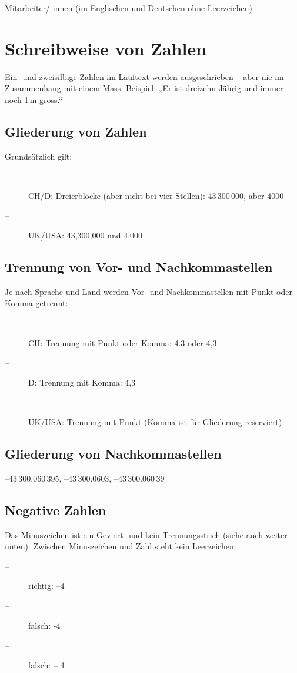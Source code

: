 Mitarbeiter/-innen (im Englischen und Deutschen ohne Leerzeichen)

\section{Schreibweise von Zahlen}

Ein- und zweisilbige Zahlen im Lauftext werden ausgeschrieben -- 
aber nie im Zusammenhang mit einem Mass. Beispiel: „Er ist dreizehn 
Jährig und immer noch 1\,m gross.“

\subsection{Gliederung von Zahlen}

Grundsätzlich gilt:
\begin{description}
  \item[--] CH/D: Dreierblöcke (aber nicht bei vier Stellen): 43\,300\,000, aber 4000
  \item[--] UK/USA: 43,300,000 und 4,000
\end{description}

\subsection{Trennung von Vor- und Nachkommastellen}

Je nach Sprache und Land werden Vor- und Nachkommastellen mit Punkt 
oder Komma getrennt: 
\begin{description}
  \item[--] CH: Trennung mit Punkt oder Komma: 4.3 oder 4,3
  \item[--] D: Trennung mit Komma: 4,3
  \item[--] UK/USA: Trennung mit Punkt (Komma ist für Gliederung reserviert)
\end{description}

\subsection{Gliederung von Nachkommastellen}
–43\,300.060\,395, –43\,300.0603, –43\,300.060\,39

\subsection{Negative Zahlen}

Das Minuszeichen ist ein Geviert- und kein Trennungsstrich 
(siehe auch weiter unten).
Zwischen Minuszeichen und Zahl steht kein Leerzeichen:
\begin{description}
 \item[--] richtig: –4
 \item[--] falsch: -4
 \item[--] falsch: – 4
\end{description}

